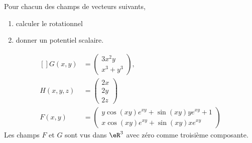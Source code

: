 
\begin{exercice}\label{exoOutilsMath-0058}

    Pour chacun des champs de vecteurs suivants,
    \begin{enumerate}
        \item
           calculer le rotationnel
        \item
            donner un potentiel scalaire.
    \end{enumerate}
    \begin{equation}
        \begin{aligned}[]
        G(x,y)&=\begin{pmatrix}
            3x^2y    \\ 
            x^3+y^3    
        \end{pmatrix},\\
        H(x,y,z)&=\begin{pmatrix}
            2x    \\ 
            2y    \\ 
            2z    
        \end{pmatrix}\\
        F(x,y)&=\begin{pmatrix}
            y\cos(xy) e^{xy}+\sin(xy)y e^{xy}+1    \\ 
            x\cos(xy) e^{xy}+\sin(xy)x e^{xy}    
        \end{pmatrix}
        \end{aligned}
    \end{equation}
    Les champs $F$ et $G$ sont vus dans $\eR^3$ avec zéro comme troisième composante.

\end{exercice}
